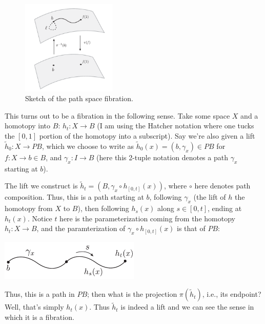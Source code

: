 \documentclass{report}
\begin{document}
\begin{figure}[t]
	\centering
	\includegraphics[width=0.4\textwidth]{fig/march/pathspace-fibration.pdf}
	\caption{Sketch of the path space fibration.}
	\label{fig:pathspace-fibration}
\end{figure}


 This turns out to be a fibration in the following
sense. Take some space $ X $ and a homotopy into $ B $: $ h_t : X \to B $ (I am
using the Hatcher notation where one tucks the $ [0,1] $ portion of the homotopy
into a subscript).  Say we're also given a lift $ \tilde{h}_0 : X \to PB $,
which we choose to write as $ \tilde{h}_0(x) = (b, \gamma_x)\in PB $ for $ f : X
\to b \in B $, and $ \gamma_x : I \to B $ (here this 2-tuple notation denotes a
path $ \gamma_x $ starting at $ b $). 

The lift we construct is $ \tilde{h}_t = (B, \gamma_x \circ h_{[0,t]} (x))$,
where $ \circ $ here denotes path composition. Thus, this is a path starting at
$ b $, following $ \gamma_x $ (the lift of $ h $ the homotopy from $ X $ to $ B
$), then following $ h_s(x) $ along $ s \in [0,t] $, ending at $ h_t(x) $.
Notice $ t $ here is the parameterization coming from the homotopy $ h_t : X \to
B$, and the paramterization of $ \gamma_x \circ h_{[0,t]} (x)$ is that of $ PB
$:

\begin{center}
	\includegraphics[width=0.5\textwidth]{fig/march/pathspace-hlp.pdf}
\end{center}

Thus, this is a path in $ PB $; then what is the projection $
\pi(\tilde{h}_t) $, i.e., its endpoint? Well, that's simply $ h_t(x) $. Thus $
\tilde{h}_t $ is indeed a lift and we can see the sense in which it is a
fibration.
\end{document}
